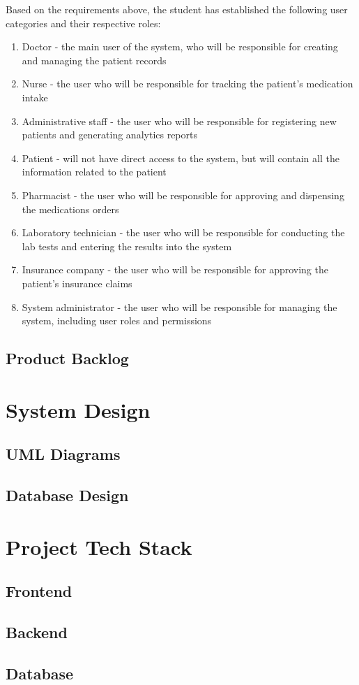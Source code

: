 Based on the requirements above, the student has established the following user categories and their respective roles:
\begin{enumerate}
    \item Doctor - the main user of the system, who will be responsible for creating and managing the patient records
    \item Nurse - the user who will be responsible for tracking the patient's medication intake
    \item Administrative staff - the user who will be responsible for registering new patients and generating analytics reports
    \item Patient - will not have direct access to the system, but will contain all the information related to the patient
    \item Pharmacist - the user who will be responsible for approving and dispensing the medications orders
    \item Laboratory technician - the user who will be responsible for conducting the lab tests and entering the results into the system
    \item Insurance company - the user who will be responsible for approving the patient's insurance claims
    \item System administrator - the user who will be responsible for managing the system, including user roles and permissions
\end{enumerate}

\subsection{Product Backlog}

\section{System Design}

\subsection{UML Diagrams}

\subsection{Database Design}

\section{Project Tech Stack}

\subsection{Frontend}

\subsection{Backend}

\subsection{Database}